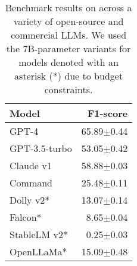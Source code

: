 \documentclass[../report.tex]{subfiles}
\begin{document}
\begin{table}[t]
\centering
\begin{tabular}{@{}lr@{}}
\toprule
Model & F1-score \\ \midrule
GPT-4 \citep{OpenAI2023GPT4}                & 65.89$\pm$0.44 \\ 
GPT-3.5-turbo                               & 53.05$\pm$0.42 \\ 
Claude v1 \citep{Anthropic2023Claude}       & 58.88$\pm$0.03 \\
Command \citep{Command2023Cohere}           & 25.48$\pm$0.11 \\
Dolly v2* \citep{DatabricksBlog2023DollyV2} & 13.07$\pm$0.14 \\
Falcon* \citep{Falcon40b}                   & 8.65$\pm$0.04  \\
StableLM v2* \citep{StableLM2023}           & 0.25$\pm$0.03  \\
OpenLLaMa* \citep{openlm2023openllama}      & 15.09$\pm$0.48 \\
\bottomrule
\end{tabular}
\caption{
    Benchmark results on \tlunified{} across a variety of open-source and commercial LLMs.
    We used the 7B-parameter variants for models denoted with an asterisk ($\ast$) due to budget constraints.
}
\label{table:results_llm}
\end{table}
\end{document}
